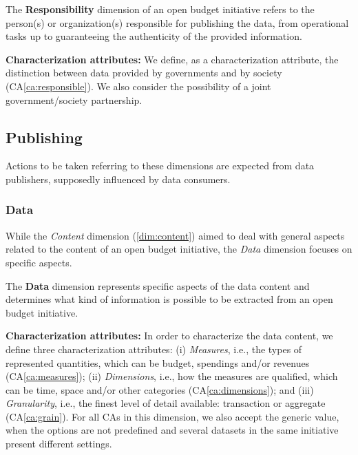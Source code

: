 		\begin{defn}The \textbf{Responsibility} dimension of an open budget initiative refers to the person(s) or organization(s) responsible for publishing the data, from operational tasks up to guaranteeing the authenticity of the provided information.
		\end{defn}
		\noindent\textbf{Characterization attributes:}
We define, as a characterization attribute, the distinction between data provided by governments and by society (CA\ref{ca:responsible}).
We also consider the possibility of a joint government/society partnership.

\subsection{Publishing}
Actions to be taken referring to these dimensions are expected from data publishers, supposedly influenced by data 
consumers.

\vspace{.1cm}
	\subsubsection{Data}
While the \emph{Content} dimension (\ref{dim:content}) aimed to deal with general aspects related to the content of an open budget initiative, the \emph{Data} dimension focuses on specific aspects.

		\begin{defn}The \textbf{Data} dimension represents specific aspects of the data content and determines what kind of information is possible to be extracted from an open budget initiative.
		\end{defn}
		\noindent\textbf{Characterization attributes:}
In order to characterize the data content, we define three characterization attributes: 
(i) \emph{Measures}, i.e., the types of represented quantities, which can be budget, spendings and/or revenues (CA\ref{ca:measures}); 
(ii) \emph{Dimensions}, i.e., how the measures are qualified, which can be time, space and/or other categories (CA\ref{ca:dimensions}); and 
(iii) \emph{Granularity}, i.e., the finest level of detail available: transaction or aggregate (CA\ref{ca:grain}). 
For all CAs in this dimension, we also accept the generic value, when the options are not predefined and several datasets in the same initiative present different settings.

\vspace{.1cm}
